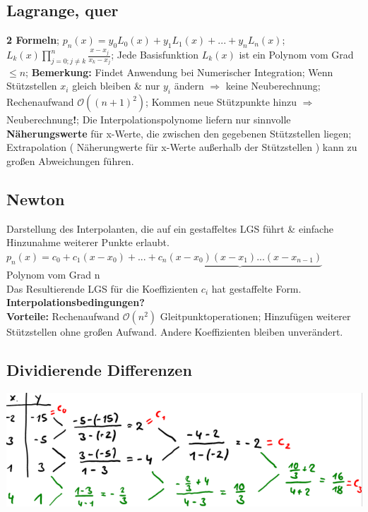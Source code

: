 \subsection{Lagrange, quer}
\textbf{2 Formeln}; 
$ p_{n}(x) = y_{0} L_{0} (x) + y_{1} L_{1} (x)+ ... +y_{n} L_{n} (x) $;
$ L_{k}(x) \prod_{ j = 0;j\neq k }^{n} \frac{ x-x_{j} }{ x_{k} - x_{j} } $; 
Jede Basisfunktion $ L_{k}(x) $ ist ein Polynom vom Grad $ \le n $; 
\textbf{Bemerkung:} Findet Anwendung bei Numerischer Integration; Wenn Stützstellen $ x_{i}  $ gleich bleiben \& nur $ y_{i} $ ändern $ \Rightarrow $ keine Neuberechnung; Rechenaufwand $ \mathcal O ( ( n +1)^{2} ) $; Kommen neue Stützpunkte hinzu $ \Rightarrow $ Neuberechnung\textbf{!}; Die Interpolationspolynome liefern nur sinnvolle \textbf{ Näherungswerte } für x-Werte, die zwischen den gegebenen Stützstellen liegen; Extrapolation ( Näherungwerte für x-Werte außerhalb der Stützstellen ) kann zu großen Abweichungen führen.

\subsection{Newton}
Darstellung des Interpolanten, die auf ein gestaffeltes LGS führt \& einfache Hinzunahme weiterer Punkte erlaubt.
$p_{n}(x) = c_{0} + c_{1} ( x-x_{0} ) + ... + \underbrace {c_{n} ( x-x_{0} ) ( x-x_{1} ) ... ( x-x_{n-1} ) } $\\
Polynom vom Grad n\\
Das Resultierende LGS für die Koeffizienten $ c_{i} $ hat gestaffelte Form.
\textbf{Interpolationsbedingungen?}\\
\textbf{Vorteile:} Rechenaufwand $ \mathcal O ( n^{2} ) $ Gleitpunktoperationen; Hinzufügen weiterer Stützstellen ohne großen Aufwand. Andere Koeffizienten bleiben unverändert.

\subsection{Dividierende Differenzen}
\includegraphics[scale=0.25]{./pic/DividierendeDifferenzen.png}


